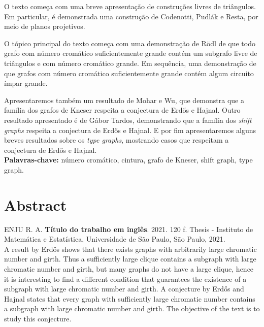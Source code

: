 \documentclass[11pt,twoside,a4paper]{book}
\begin{document}
O texto começa com uma breve apresentação de construções livres de triângulos. Em particular, é demonstrada uma construção de Codenotti, Pudlák e Resta, por meio de planos projetivos.

O tópico principal do texto começa com uma demonstração de R\"{o}dl de que todo grafo com número cromático suficientemente grande contém um subgrafo livre de triângulos e com número cromático grande. Em sequência, uma demonstração de que grafos com número cromático suficientemente grande contém algum circuito ímpar grande.

Apresentaremos também um resultado de Mohar e Wu, que demonstra que a família dos grafos de Kneser respeita a conjectura de Erd\H{o}s e Hajnal. Outro resultado apresentado é de Gábor Tardos, demonstrando que a família dos \textit{shift graphs} respeita a conjectura de Erd\H{o}s e Hajnal. E por fim apresentaremos alguns breves resultados sobre os \textit{type graphs}, mostrando casos que respeitam a conjectura de Erd\H{o}s e Hajnal.
\\
% 

\noindent \textbf{Palavras-chave:} número cromático, cintura, grafo de Kneser, shift graph, type graph.

\chapter*{Abstract}
\noindent ENJU R. A. \textbf{Título do trabalho em inglês}. 
2021. 120 f.
Thesis - Instituto de Matemática e Estatística,
Universidade de São Paulo, São Paulo, 2021.
\\

A result by Erd\H{o}s shows that there exists graphs with arbitrarily large chromatic number and girth. Thus a sufficiently large clique contains a subgraph with large chromatic number and girth, but many graphs do not have a large clique, hence it is interesting to find a different condition that guarantees the existence of a subgraph with large chromatic number and girth. A conjecture by Erd\H{o}s and Hajnal states that every graph with sufficiently large chromatic number contains a subgraph with large chromatic number and girth. The objective of the text is to study this conjecture.
\end{document}
